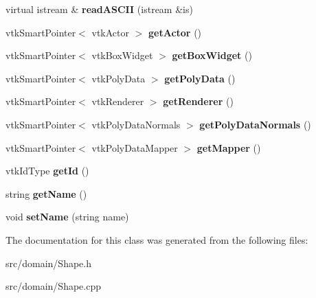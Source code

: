 \begin{DoxyCompactItemize}
\item 
\hypertarget{class_shape_a0a6173c6cdb906d030fca93348bbcb34}{}virtual istream \& {\bfseries read\+A\+S\+C\+I\+I} (istream \&is)\label{class_shape_a0a6173c6cdb906d030fca93348bbcb34}

\item 
\hypertarget{class_shape_a9342c008eaa5d312df8927a81a77960b}{}vtk\+Smart\+Pointer$<$ vtk\+Actor $>$ {\bfseries get\+Actor} ()\label{class_shape_a9342c008eaa5d312df8927a81a77960b}

\item 
\hypertarget{class_shape_aa6623c3ec6545de8f2182551142386be}{}vtk\+Smart\+Pointer$<$ vtk\+Box\+Widget $>$ {\bfseries get\+Box\+Widget} ()\label{class_shape_aa6623c3ec6545de8f2182551142386be}

\item 
\hypertarget{class_shape_a70b7e4429d766baf95cd24534eb1edb8}{}vtk\+Smart\+Pointer$<$ vtk\+Poly\+Data $>$ {\bfseries get\+Poly\+Data} ()\label{class_shape_a70b7e4429d766baf95cd24534eb1edb8}

\item 
\hypertarget{class_shape_aabee8928d7e05344678e4144f995f80b}{}vtk\+Smart\+Pointer$<$ vtk\+Renderer $>$ {\bfseries get\+Renderer} ()\label{class_shape_aabee8928d7e05344678e4144f995f80b}

\item 
\hypertarget{class_shape_a1fe4baf1f2a1223a48caa11dfc9914b1}{}vtk\+Smart\+Pointer$<$ vtk\+Poly\+Data\+Normals $>$ {\bfseries get\+Poly\+Data\+Normals} ()\label{class_shape_a1fe4baf1f2a1223a48caa11dfc9914b1}

\item 
\hypertarget{class_shape_a49ac6e4084a14b19c969e576f8068cc5}{}vtk\+Smart\+Pointer$<$ vtk\+Poly\+Data\+Mapper $>$ {\bfseries get\+Mapper} ()\label{class_shape_a49ac6e4084a14b19c969e576f8068cc5}

\item 
\hypertarget{class_shape_a3bda0a588a5068b0e581650b5bebcd54}{}vtk\+Id\+Type {\bfseries get\+Id} ()\label{class_shape_a3bda0a588a5068b0e581650b5bebcd54}

\item 
\hypertarget{class_shape_a60a27ae8a862de4b55790a1e979ad266}{}string {\bfseries get\+Name} ()\label{class_shape_a60a27ae8a862de4b55790a1e979ad266}

\item 
\hypertarget{class_shape_a489da86bf4290d678678621727c1303a}{}void {\bfseries set\+Name} (string name)\label{class_shape_a489da86bf4290d678678621727c1303a}

\end{DoxyCompactItemize}


The documentation for this class was generated from the following files\+:\begin{DoxyCompactItemize}
\item 
src/domain/Shape.\+h\item 
src/domain/Shape.\+cpp\end{DoxyCompactItemize}
